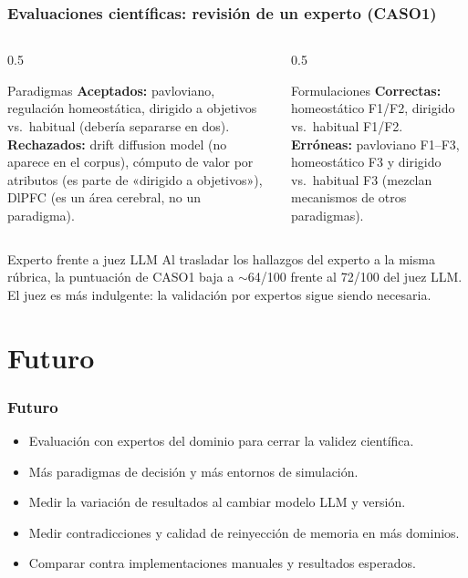 \documentclass{beamer}
\begin{document}
\begin{frame}
  \frametitle{Evaluaciones científicas: revisión de un experto (CASO1)}
  \footnotesize
  \begin{columns}[T]
  \begin{column}{0.5\textwidth}
  \begin{block}{Paradigmas}
    \textbf{Aceptados:} pavloviano, regulación homeostática, dirigido a
    objetivos vs.\ habitual (debería separarse en dos).\\[3pt]
    \textbf{Rechazados:} drift diffusion model (no aparece en el corpus),
    cómputo de valor por atributos (es parte de «dirigido a objetivos»),
    DlPFC (es un área cerebral, no un paradigma).
  \end{block}
  \end{column}
  \begin{column}{0.5\textwidth}
  \begin{block}{Formulaciones}
    \textbf{Correctas:} homeostático F1/F2, dirigido vs.\ habitual F1/F2.\\[3pt]
    \textbf{Erróneas:} pavloviano F1--F3, homeostático F3 y dirigido vs.\
    habitual F3 (mezclan mecanismos de otros paradigmas).
  \end{block}
  \end{column}
  \end{columns}

  \begin{alertblock}{Experto frente a juez LLM}
    Al trasladar los hallazgos del experto a la misma rúbrica, la puntuación
    de CASO1 baja a $\sim$64/100 frente al 72/100 del juez LLM. El juez es más
    indulgente: la validación por expertos sigue siendo necesaria.
  \end{alertblock}
\end{frame}

\section{Futuro}

\begin{frame}
  \frametitle{Futuro}
  \begin{itemize}
    \item Evaluación con expertos del dominio para cerrar la validez científica.
    \item Más paradigmas de decisión y más entornos de simulación.
    \item Medir la variación de resultados al cambiar modelo LLM y versión.
    \item Medir contradicciones y calidad de reinyección de memoria en más dominios.
    \item Comparar contra implementaciones manuales y resultados esperados.
  \end{itemize}
\end{frame}
\end{document}
